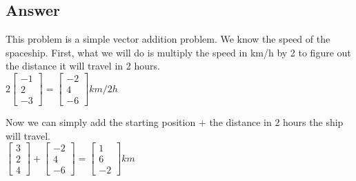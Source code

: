 \documentclass[12pt]{article}
\begin{document}
    \subsection*{Answer}
    \begin{flushleft}
        This problem is a simple vector addition problem. We know the speed of the spaceship. First, what we will do
        is multiply the speed in km/h by 2 to figure out the distance it will travel in 2 hours. \\
        $
            2
            \begin{bmatrix}
                -1 \\ 2 \\ -3
            \end{bmatrix}
            =
            \begin{bmatrix}
                -2 \\ 4 \\ -6
            \end{bmatrix}
            km/2h
        $
    \end{flushleft}
    \begin{flushleft}
        Now we can simply add the starting position + the distance in 2 hours the ship will travel. \\
        $
            \begin{bmatrix}
                3 \\ 2 \\ 4
            \end{bmatrix}
            +
            \begin{bmatrix}
                -2 \\ 4 \\ -6
            \end{bmatrix}
            =
            \boxed{
                \begin{bmatrix}
                    1 \\ 6 \\ -2
                \end{bmatrix}
                km
            }
        $
    \end{flushleft}
\end{document}

